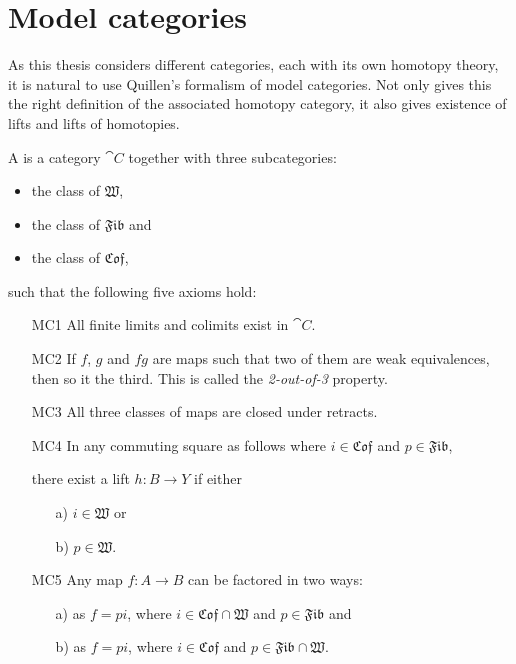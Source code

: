 
\section{Model categories}
\label{sec:model_categories}

As this thesis considers different categories, each with its own homotopy theory, it is natural to use Quillen's formalism of model categories. Not only gives this the right definition of the associated homotopy category, it also gives existence of lifts and lifts of homotopies.

\newcommand{\W}{\mathfrak{W}}
\newcommand{\Fib}{\mathfrak{Fib}}
\newcommand{\Cof}{\mathfrak{Cof}}

\begin{definition}
	A  is a category $\cat{C}$ together with three subcategories:
	\begin{itemize}
		\item the class of  $\W$,
		\item the class of  $\Fib$ and
		\item the class of  $\Cof$,
	\end{itemize}
	such that the following five axioms hold:
	\begin{itemize}
		\item[MC1] All finite limits and colimits exist in $\cat{C}$.
		\item[MC2] If $f$, $g$ and $fg$ are maps such that two of them are weak equivalences, then so it the third. This is called the \emph{2-out-of-3} property.
		\item[MC3] All three classes of maps are closed under retracts.
		\item[MC4] In any commuting square as follows where $i \in \Cof$ and $p \in \Fib$,

			there exist a lift $h: B \to Y$ if either 
			\begin{itemize}
				\item[a)] $i \in \W$ or
				\item[b)] $p \in \W$.
			\end{itemize}
		\item[MC5] Any map $f : A \to B$ can be factored in two ways:
			\begin{itemize}
				\item[a)] as $f = pi$, where $i \in \Cof \cap \W$ and $p \in \Fib$ and
				\item[b)] as $f = pi$, where $i \in \Cof$ and $p \in \Fib \cap \W$.
			\end{itemize}
	\end{itemize}
\end{definition}

